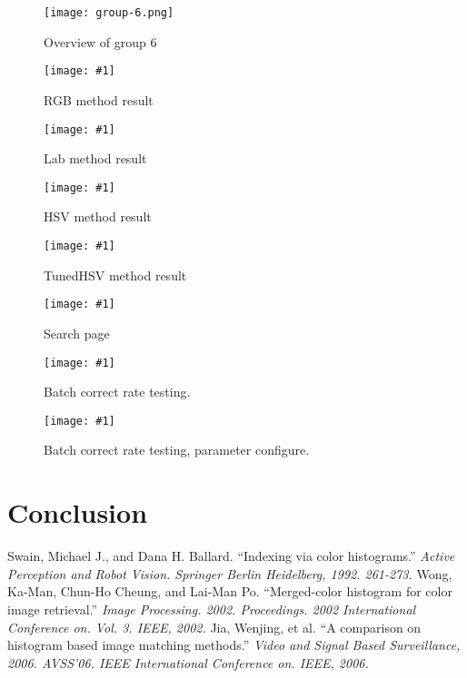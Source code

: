 \documentclass[11pt,a4paper]{article}
\newcommand{\addPic}[1]{\texttt{[image: \#1]}}
\begin{document}
\begin{figure}[h]
    \texttt{[image: group-6.png]}
    \caption{Overview of group 6}
    \label{fig:group-6}
\end{figure}


\begin{figure}[b]
    \addPic{RGB-result-croped.png}
    \caption{RGB method result}
    \label{fig:RGB-result}
\end{figure}
\begin{figure}[b]
    \addPic{Lab-result-croped.png}
    \caption{Lab method result}
    \label{fig:Lab-result}
\end{figure}
\begin{figure}[b]
    \addPic{HSV-result-croped.png}
    \caption{HSV method result}
    \label{fig:HSV-result}
\end{figure}
\begin{figure}[b]
    \addPic{TunedHSV-result-croped.png}
    \caption{TunedHSV method result}
    \label{fig:TunedHSV-result}
\end{figure}

\begin{figure}[b]
    \addPic{search-page-croped.png}
    \caption{Search page}
    \label{fig:search-page}
\end{figure}
\begin{figure}[b]
    \addPic{test-rate-page-croped.png}
    \caption{Batch correct rate testing.}
    \label{fig:test-rate-page}
\end{figure}
\begin{figure}[b]
    \addPic{test-rate-param-page-croped.png}
    \caption{Batch correct rate testing, parameter configure.}
    \label{fig:test-rate-param-page}
\end{figure}

\section{Conclusion}


\begin{thebibliography}{9}
    Swain, Michael J., and Dana H. Ballard. 
    ``Indexing via color histograms.'' 
    \emph{
        Active Perception and Robot Vision. Springer Berlin Heidelberg, 1992. 261-273.
    }
    Wong, Ka-Man, Chun-Ho Cheung, and Lai-Man Po. ``Merged-color histogram for color image retrieval.''
    \emph{
        Image Processing. 2002. Proceedings. 2002 International Conference on. Vol. 3. IEEE, 2002.
    }
    Jia, Wenjing, et al. ``A comparison on histogram based image matching methods.''
    \emph{
        Video and Signal Based Surveillance, 2006. AVSS'06. IEEE International Conference on. IEEE, 2006.
    }

\end{thebibliography}
\end{document}
